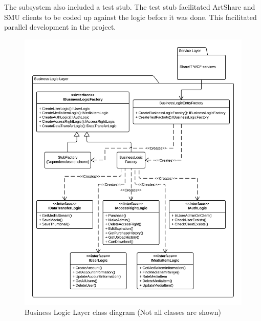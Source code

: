 \documentclass[../report.tex]{subfiles}
\begin{document}
The subsystem also included a test stub. The test stub facilitated ArtShare and SMU clients to be coded up against the logic before it was done. This facilitated parallel development in the project.






\begin{figure}
\centering
\includegraphics[width=\linewidth]{BLLclassdiagram.png}
\caption{Business Logic Layer class diagram (Not all classes are shown)}
\label{fig:BLLclassdiagram}
\end{figure}
\end{document}
